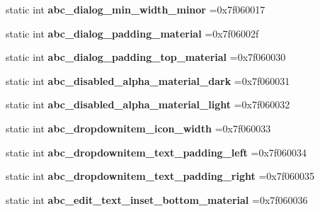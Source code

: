 \begin{DoxyCompactItemize}
static int {\bfseries abc\+\_\+dialog\+\_\+min\+\_\+width\+\_\+minor} =0x7f060017
\item 
\mbox{\label{classandroid_1_1support_1_1v4_1_1R_1_1dimen_a78707c9633d4eb57d8cd5b91b5b39467}} 
static int {\bfseries abc\+\_\+dialog\+\_\+padding\+\_\+material} =0x7f06002f
\item 
\mbox{\label{classandroid_1_1support_1_1v4_1_1R_1_1dimen_acf9abbeb1553d5e8ebef3b1e4377a368}} 
static int {\bfseries abc\+\_\+dialog\+\_\+padding\+\_\+top\+\_\+material} =0x7f060030
\item 
\mbox{\label{classandroid_1_1support_1_1v4_1_1R_1_1dimen_a927ac5065e09878569216ec6ec1e588e}} 
static int {\bfseries abc\+\_\+disabled\+\_\+alpha\+\_\+material\+\_\+dark} =0x7f060031
\item 
\mbox{\label{classandroid_1_1support_1_1v4_1_1R_1_1dimen_a7716947057d81655736d8c8144ebcf09}} 
static int {\bfseries abc\+\_\+disabled\+\_\+alpha\+\_\+material\+\_\+light} =0x7f060032
\item 
\mbox{\label{classandroid_1_1support_1_1v4_1_1R_1_1dimen_a08b4efd389d808993f2869d9f09144ab}} 
static int {\bfseries abc\+\_\+dropdownitem\+\_\+icon\+\_\+width} =0x7f060033
\item 
\mbox{\label{classandroid_1_1support_1_1v4_1_1R_1_1dimen_ad89f6e23edd7b4d7e3019a9b53e5cb14}} 
static int {\bfseries abc\+\_\+dropdownitem\+\_\+text\+\_\+padding\+\_\+left} =0x7f060034
\item 
\mbox{\label{classandroid_1_1support_1_1v4_1_1R_1_1dimen_a792c743cb04dff8ac9d8a0b8e58a8e71}} 
static int {\bfseries abc\+\_\+dropdownitem\+\_\+text\+\_\+padding\+\_\+right} =0x7f060035
\item 
\mbox{\label{classandroid_1_1support_1_1v4_1_1R_1_1dimen_a0359467a0db7a7727316b5d0d9cd61ac}} 
static int {\bfseries abc\+\_\+edit\+\_\+text\+\_\+inset\+\_\+bottom\+\_\+material} =0x7f060036

\end{DoxyCompactItemize}

